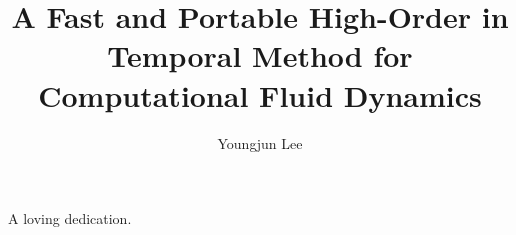 




\title{A Fast and Portable High-Order in Temporal Method for Computational Fluid Dynamics}
\author{Youngjun Lee}
\deanlinethree{}

\begin{frontmatter}
\maketitle

\copyrightpage

\tableofcontents

\listoffigures

\listoftables

\begin{abstract}

\end{abstract}

\begin{dedication}
\vspace*{\fill}
\begin{center}
A loving dedication.
\end{center}
\vspace*{\fill}
\end{dedication}

\begin{acknowledgements}

\end{acknowledgements}

\end{frontmatter}















\nocite{*}

\singlespacing

\doublespacing


